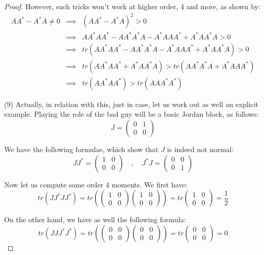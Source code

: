 \documentclass[12pt]{amsbook}
\begin{document}
\begin{proof}
However, such tricks won't work at higher order, 4 and more, as shown by:
\begin{eqnarray*}
AA^*-A^*A\neq0
&\implies&(AA^*-A^*A)^2>0\\
&\implies&AA^*AA^*-AA^*A^*A-A^*AAA^*+A^*AA^*A>0\\
&\implies&tr(AA^*AA^*-AA^*A^*A-A^*AAA^*+A^*AA^*A)>0\\
&\implies&tr(AA^*AA^*+A^*AA^*A)>tr(AA^*A^*A+A^*AAA^*)\\
&\implies&tr(AA^*AA^*)>tr(AAA^*A^*)
\end{eqnarray*}

(9) Actually, in relation with this, just in case, let us work out as well an explicit example. Playing the role of the bad guy will be a basic Jordan block, as follows:
$$J=\begin{pmatrix}0&1\\0&0\end{pmatrix}$$

We have the following formulae, which show that $J$ is indeed not normal:
$$JJ^*=\begin{pmatrix}1&0\\0&0\end{pmatrix}\quad,\quad 
J^*J=\begin{pmatrix}0&0\\0&1\end{pmatrix}$$

Now let us compute some order 4 moments. We first have:
$$tr(JJ^*JJ^*)
=tr\left(\begin{pmatrix}1&0\\0&0\end{pmatrix}\begin{pmatrix}1&0\\0&0\end{pmatrix}\right)
=tr\begin{pmatrix}1&0\\0&0\end{pmatrix}
=\frac{1}{2}$$

On the other hand, we have as well the following formula:
$$tr(JJJ^*J^*)
=tr\left(\begin{pmatrix}0&0\\0&0\end{pmatrix}
\begin{pmatrix}0&0\\0&0\end{pmatrix}
\right)
=tr\begin{pmatrix}0&0\\0&0\end{pmatrix}
=0$$


\end{proof}
\end{document}

